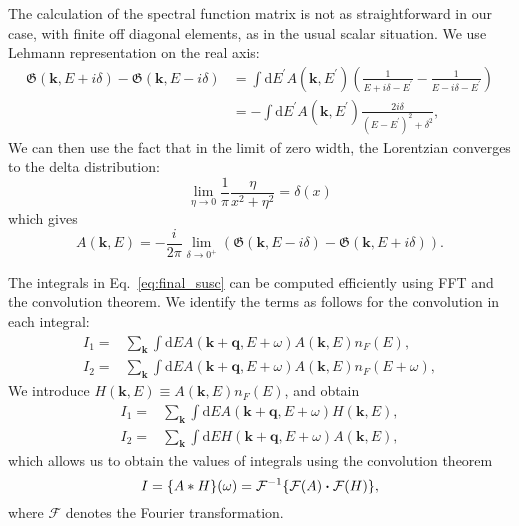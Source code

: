 \documentclass[preprint,prb,amsmath,superscriptaddress,showpacs]{revtex4}
\newcommand{\bk}{\mathbf{k}}
\begin{document}
The calculation of the spectral function matrix is not as
straightforward in our case, with finite off diagonal elements, as in
the usual scalar situation. We use Lehmann representation on the real axis:
%
\begin{equation}
  \begin{aligned}
    \mathfrak{G}(\bk, E + i\delta) - \mathfrak{G}(\bk, E - i\delta) &=
    \int \mathrm{d}E^{\prime} A(\mathbf{k}, E^{\prime})
  \left(\frac{1}{E + i\delta - E^{\prime}} - \frac{1}{E - i\delta -
      E^{\prime}} \right) \\
  &= -\int \mathrm{d}E^{\prime} A(\mathbf{k}, E^{\prime})
  \frac{2i\delta}{(E - E^{\prime})^2 + \delta^2},
  \end{aligned}
\end{equation}
%
We can then use the fact that in the limit of zero width, the
Lorentzian converges to the delta distribution:
\begin{equation*}
  \lim_{\eta\to 0} \dfrac{1}{\pi} \dfrac{\eta}{x^2+\eta^2} = \delta(x)
\end{equation*}
which gives
% 
\begin{equation}
A(\mathbf{k}, E) = - \frac{i}{2\pi}
  \lim_{\delta\to 0^{+}} \left( \mathfrak{G}(\bk, E -
    i\delta) - \mathfrak{G}(\bk, E + i\delta) \right).
\end{equation}

\newpage

The integrals in Eq.~\eqref{eq:final_susc} can be computed efficiently
using FFT and the convolution theorem. We identify the terms as
follows for the convolution in each integral:
% 
\begin{align*}
I_1 =& \sum_{\mathbf{k}} \int  \mathrm{d}E A(\mathbf{k} +
       \mathbf{q}, E + \omega) A(\mathbf{k}, E) n_F(E), \\
I_2 =& \sum_{\mathbf{k}} \int  \mathrm{d}E A(\mathbf{k} +
       \mathbf{q}, E + \omega) A(\mathbf{k}, E) n_F(E+\omega),
\end{align*}
%
We introduce $H(\mathbf{k}, E) \equiv
A(\mathbf{k}, E) n_F(E)$, and obtain
%
\begin{align*}
I_1 =& \sum_{\mathbf{k}} \int  \mathrm{d}E A(\mathbf{k} +
       \mathbf{q}, E + \omega) H(\mathbf{k}, E), \\
I_2 =& \sum_{\mathbf{k}} \int  \mathrm{d}E H(\mathbf{k} +
       \mathbf{q}, E + \omega) A(\mathbf{k}, E),
\end{align*}
%
which allows us to obtain the values of integrals using the
convolution theorem 
%
\begin{equation}
I = \{ A * H \}(\omega) = \mathcal{F}^{-1} \{ \mathcal{F}(A)
\dotproduct \mathcal{F}(H) \},
\end{equation}
%
where $\mathcal{F}$ denotes the Fourier transformation.


\end{document}
